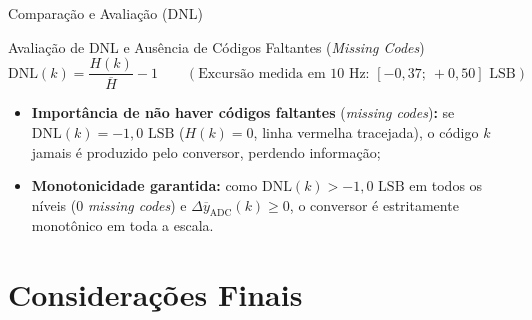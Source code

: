 \documentclass{beamer}
\begin{document}
\begin{frame}{Comparação e Avaliação (DNL)}
\centering
{}

\vspace{-0.15cm}
\begin{exampleblock}{Avaliação de DNL e Ausência de Códigos Faltantes (\textit{Missing Codes})}
\footnotesize
\[
\text{DNL}(k) = \frac{H(k)}{\overline{H}} - 1 \qquad \left(\text{Excursão medida em } 10\text{ Hz: } [-0{,}37;\ +0{,}50]\text{ LSB}\right)
\]
\vspace{-0.25cm}
\begin{itemize}
    \item \textbf{Importância de não haver códigos faltantes} (\textit{missing codes})\textbf{:} se $\text{DNL}(k) = -1{,}0\text{ LSB}$ ($H(k) = 0$, linha vermelha tracejada), o código $k$ jamais é produzido pelo conversor, perdendo informação;
    \item \textbf{Monotonicidade garantida:} como $\text{DNL}(k) > -1{,}0\text{ LSB}$ em todos os níveis ($0$ \textit{missing codes}) e $\Delta \overline{y}_{\text{ADC}}(k) \ge 0$, o conversor é estritamente monotônico em toda a escala.
\end{itemize}
\end{exampleblock}
\end{frame}

\section{Considerações Finais}
\end{document}
